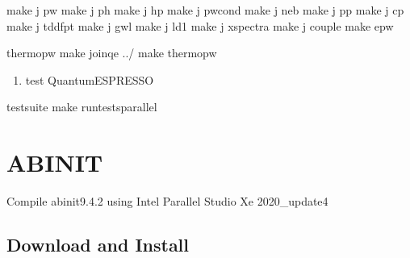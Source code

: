 \documentclass[a4paper,12pt,english]{sphinxmanual}
\begin{document}
\begin{sphinxVerbatim}[commandchars=\\\{\}]
make \PYGZhy{}j  pw  make \PYGZhy{}j  ph  make \PYGZhy{}j  hp  make \PYGZhy{}j  pwcond  make \PYGZhy{}j  neb 
     make \PYGZhy{}j  pp  make \PYGZhy{}j  cp  make \PYGZhy{}j  tddfpt  make \PYGZhy{}j  gwl 
     make \PYGZhy{}j  ld1  make \PYGZhy{}j  xspectra  make \PYGZhy{}j  couple  make epw

 thermo\PYGZus{}pw  make join\PYGZus{}qe   ../  make thermo\PYGZus{}pw
\end{sphinxVerbatim}
\begin{enumerate}
%
\setcounter{enumi}{4}
\item {} 
\sphinxAtStartPar
test Quantum\sphinxhyphen{}ESPRESSO

\end{enumerate}

\begin{sphinxVerbatim}[commandchars=\\\{\}]
 test\PYGZhy{}suite  make run\PYGZhy{}tests\PYGZhy{}parallel
\end{sphinxVerbatim}


\section{ABINIT}
\label{\detokenize{compile:abinit}}
\sphinxAtStartPar
Compile abinit\sphinxhyphen{}9.4.2 using Intel Parallel Studio Xe 2020\_update4


\subsection{Download and Install}
\label{\detokenize{compile/abinit_9.4.2:download-and-install}}\label{\detokenize{compile/abinit_9.4.2::doc}}
\end{document}
